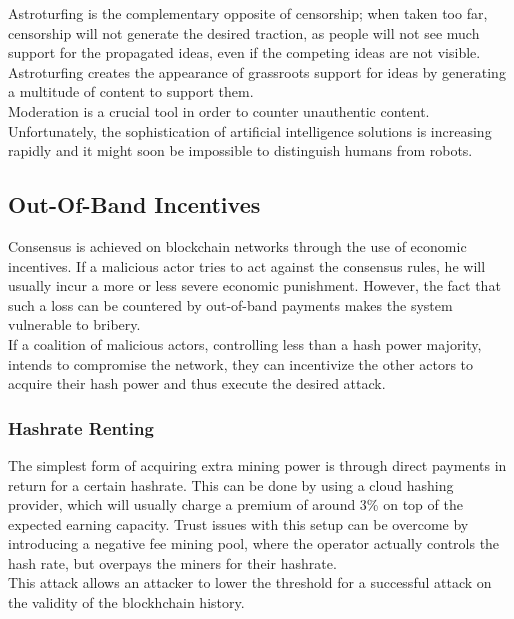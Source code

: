 \documentclass[11pt,a4paper]{article}
\begin{document}
Astroturfing is the complementary opposite of censorship; when taken too far, censorship will not generate the desired traction, as people will not see much support for the propagated ideas, even if the competing ideas are not visible. Astroturfing creates the appearance of grassroots support for ideas by generating a multitude of content to support them.\\

Moderation is a crucial tool in order to counter unauthentic content. Unfortunately, the sophistication of artificial intelligence solutions is increasing rapidly and it might soon be impossible to distinguish humans from robots.\\

\subsection{Out-Of-Band Incentives}

Consensus is achieved on blockchain networks through the use of economic incentives. If a malicious actor tries to act against the consensus rules, he will usually incur a more or less severe economic punishment. However, the fact that such a loss can be countered by out-of-band payments makes the system vulnerable to bribery.\\

If a coalition of malicious actors, controlling less than a hash power majority, intends to compromise the network, they can incentivize the other actors to acquire their hash power and thus execute the desired attack.\\

\subsubsection{Hashrate Renting}

The simplest form of acquiring extra mining power is through direct payments in return for a certain hashrate. This can be done by using a cloud hashing provider, which will usually charge a premium of around 3\% on top of the expected earning capacity. Trust issues with this setup can be overcome by introducing a negative fee mining pool, where the operator actually controls the hash rate, but overpays the miners for their hashrate.\\

This attack allows an attacker to lower the threshold for a successful attack on the validity of the blockhchain history.\\
\end{document}
